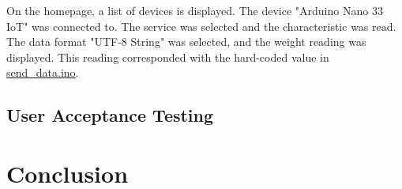 \documentclass[class=report,11pt,crop=false]{standalone}
\begin{document}
		On the homepage, a list of devices is displayed. The device "Arduino Nano 33 IoT" was connected to. The service was selected and the characteristic was read. The data format "UTF-8 String" was selected, and the weight reading was displayed. This reading corresponded with the hard-coded value in \href{https://github.com/karanimaan/EEE4113F-Project--Group-26/blob/main/send_data/send_data.ino}{send\_data.ino}.

	
	\subsection{User Acceptance Testing}
	
	\section{Conclusion}
	
	\ifstandalone
	
	\printnoidxglossary[type=\acronymtype,nonumberlist]
	\fi
\end{document}
